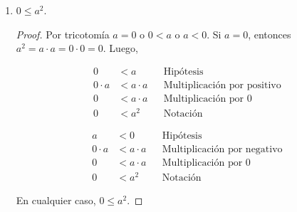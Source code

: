 \documentclass[11pt]{article}
\newcommand{\R}{\mathbb{R}}
\begin{document}
\begin{enumerate}[label=\alph*)]

\pagebreak

    \item $0\leq a^2$.
    \vspace{-1em}\begin{proof} 
        Por tricotomía $a=0$ o $0<a$ o $a<0$. Si $a=0$, entonces $a^2=a\cdot a =0 \cdot 0 =0$. Luego,
        \begin{center}\vspace{-1em}
            \begin{minipage}[l]{.5\linewidth}
                \begin{align*}
                    0 &< a && \text{Hipótesis}\\
                    0 \cdot a &< a \cdot a && \text{Multiplicación por positivo}\\
                    0 &< a \cdot a && \text{Multiplicación por 0}\\
                    0 &< a^2 && \text{Notación}
                \end{align*}
            \end{minipage}%
            \begin{minipage}[r]{.5\linewidth}
                \begin{align*}
                    a &< 0 && \text{Hipótesis}\\
                    0 \cdot a &< a\cdot a && \text{Multiplicación por negativo}\\
                    0 &< a\cdot a && \text{Multiplicación por 0}\\
                    0 &< a^2 && \text{Notación}
                \end{align*}
            \end{minipage}
        \end{center} En cualquier caso, $0\leq a^2$.
    \end{proof} \vspace{-1em}
    

\end{enumerate}
\end{document}
